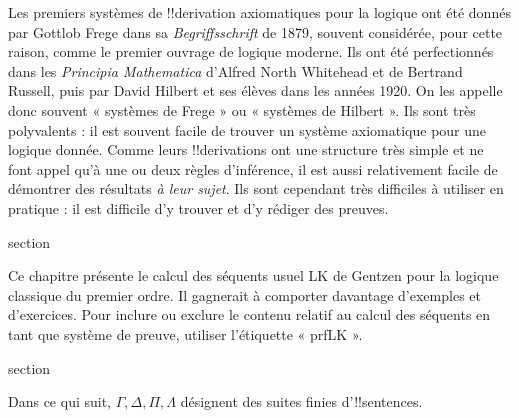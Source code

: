 \documentclass[11pt,a4paper,openany]{memoir}
\begin{document}
Les premiers systèmes de !!{derivation} axiomatiques pour la logique
ont été donnés par Gottlob Frege dans sa \emph{Begriffsschrift} de 1879,
souvent considérée, pour cette raison, comme le premier ouvrage de
logique moderne. Ils ont été perfectionnés dans les
\emph{Principia Mathematica} d'Alfred North Whitehead et de Bertrand
Russell, puis par David Hilbert et ses élèves dans les années 1920.
On les appelle donc souvent « systèmes de Frege » ou « systèmes de
Hilbert ». Ils sont très polyvalents : il est souvent facile de trouver
un système axiomatique pour une logique donnée. Comme leurs
!!{derivation}s ont une structure très simple et ne font appel qu'à
une ou deux règles d'inférence, il est aussi relativement facile de
démontrer des résultats \emph{à leur sujet}. Ils sont cependant très
difficiles à utiliser en pratique : il est difficile d'y trouver et
d'y rédiger des preuves.


\endgroup


\OLEndChapterHook


\endgroup


\begingroup
\expandafter\def\csname ol@sectioncs\endcsname{section}
\def\olfilename{sequent-calculus}


      {}
      {}

\begin{editorial}
  Ce chapitre présente le calcul des séquents usuel LK de Gentzen pour
  la logique classique du premier ordre. Il gagnerait à comporter
  davantage d'exemples et d'exercices. Pour inclure ou exclure le contenu
  relatif au calcul des séquents en tant que système de preuve,
  utiliser l'étiquette « prfLK ».
\end{editorial}


\begingroup
\expandafter\def\csname ol@sectioncs\endcsname{section}
\def\olfilename{rules-and-proofs}


      {}
      {}


Dans ce qui suit, $\Gamma, \Delta, \Pi, \Lambda$ désignent des suites
finies d'!!{sentence}s.
\end{document}
